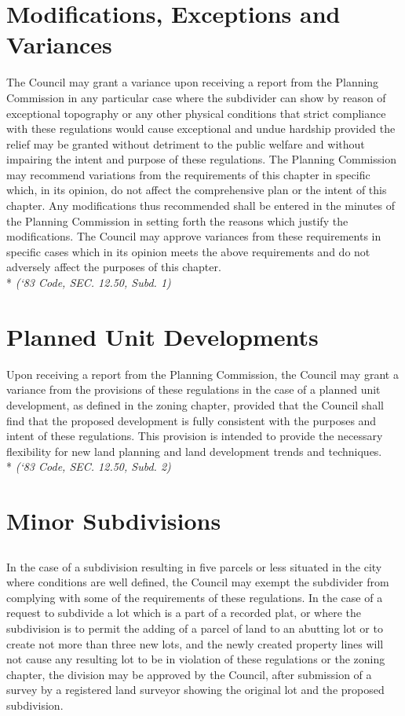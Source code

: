 \section{Modifications, Exceptions and Variances}
The Council may grant a variance upon receiving a report from the Planning Commission in any particular case where the subdivider can show by reason of exceptional topography or any other physical conditions that strict compliance with these regulations would cause exceptional and undue hardship provided the relief may be granted without detriment to the public welfare and without impairing the intent and purpose of these regulations. The Planning Commission may recommend variations from the requirements of this chapter in specific which, in its opinion, do not affect the comprehensive plan or the intent of this chapter.  Any modifications thus recommended shall be entered in the minutes of the Planning Commission in setting forth the reasons which justify the modifications.  The Council may approve variances from these requirements in specific cases which in its opinion meets the above requirements and do not adversely affect the purposes of this chapter.\\*
\emph{(‘83 Code, SEC. 12.50, Subd. 1)}
\section{Planned Unit Developments}
Upon receiving a report from the Planning Commission, the Council may grant a variance from the provisions of these regulations in the case of a planned unit development, as defined in the zoning chapter, provided that the Council shall find that the proposed development is fully consistent with the purposes and intent of these regulations. This provision is intended to provide the necessary flexibility for new land planning and land development trends and techniques.\\*
\emph{(‘83 Code, SEC. 12.50, Subd. 2)}
\section{Minor Subdivisions}
\subsection{}
In the case of a subdivision resulting in five parcels or less situated in the city where conditions are well defined, the Council may exempt the subdivider from complying with some of the requirements of these regulations. In the case of a request to subdivide a lot which is a part of a recorded plat, or where the subdivision is to permit the adding of a parcel of land to an abutting lot or to create not more than three new lots, and the newly created property lines will not cause any resulting lot to be in violation of these regulations or the zoning chapter, the division may be approved by the Council, after submission of a survey by a registered land surveyor showing the original lot and the proposed subdivision.
